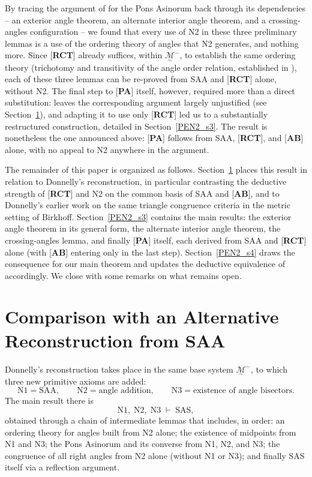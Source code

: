 \documentclass[11pt,a4paper]{article}
\theoremstyle{definition}
\theoremstyle{remark}
\numberwithin{equation}{section}
\newcommand{\MG}{\underset{\sim}{\mathcal{M}}}
\begin{document}
By tracing the argument of \cite{Donnelly2025} for the Pons Asinorum back through its
dependencies -- an exterior angle theorem, an alternate interior angle theorem, and a
crossing-angles configuration -- we found that every use of N2 in these three preliminary
lemmas is a use of the ordering theory of angles that N2 generates, and nothing more. Since
[\textbf{RCT}] already suffices, within $\MG^{-}$, to establish the same ordering theory
(trichotomy and transitivity of the angle order relation, established in
\cite{Volpe2026I}), each of these three lemmas can be re-proved from SAA and [\textbf{RCT}]
alone, without N2. The final step to [\textbf{PA}] itself, however, required more than a
direct substitution: \cite{Donnelly2025} leaves the corresponding argument largely
unjustified (see Section~\ref{PEN2_s2}), and adapting it to use only [\textbf{RCT}] led us to
a substantially restructured construction, detailed in Section~\ref{PEN2_s3}. The result is
nonetheless the one announced above: [\textbf{PA}] follows from SAA, [\textbf{RCT}], and
[\textbf{AB}] alone, with no appeal to N2 anywhere in the argument.

The remainder of this paper is organized as follows. Section~\ref{PEN2_s2} places this
result in relation to Donnelly's reconstruction, in particular contrasting the deductive
strength of [\textbf{RCT}] and N2 on the common basis of SAA and [\textbf{AB}], and to Donnelly's
earlier work on the same triangle congruence criteria in the metric setting of Birkhoff.
Section~\ref{PEN2_s3} contains the main results: the exterior angle theorem in its general
form, the alternate interior angle theorem, the crossing-angles lemma, and finally
[\textbf{PA}] itself, each derived from SAA and [\textbf{RCT}] alone (with [\textbf{AB}] entering
only in the last step). Section~\ref{PEN2_s4} draws the consequence for our main theorem and
updates the deductive equivalence of \cite{Volpe2026I} accordingly. We close with some
remarks on what remains open.

\section{Comparison with an Alternative Reconstruction from SAA}\label{PEN2_s2}

Donnelly's reconstruction \cite{Donnelly2025} takes place in the same base system
$\MG^{-}$, to which three new primitive axioms are added:
\begin{equation*}
\textrm{N1}=\textrm{SAA},\qquad
\textrm{N2}=\text{angle addition},\qquad
\textrm{N3}=\text{existence of angle bisectors}.
\end{equation*}
The main result there is
\begin{equation*}
\textrm{N1},\;\textrm{N2},\;\textrm{N3}\;\vdash\;\textrm{SAS},
\end{equation*}
obtained through a chain of intermediate lemmas that includes, in order: an ordering theory
for angles built from N2 alone; the existence of midpoints from N1 and N3; the Pons Asinorum
and its converse from N1, N2, and N3; the congruence of all right angles from N2 alone
(without N1 or N3); and finally SAS itself via a reflection argument.
\end{document}
